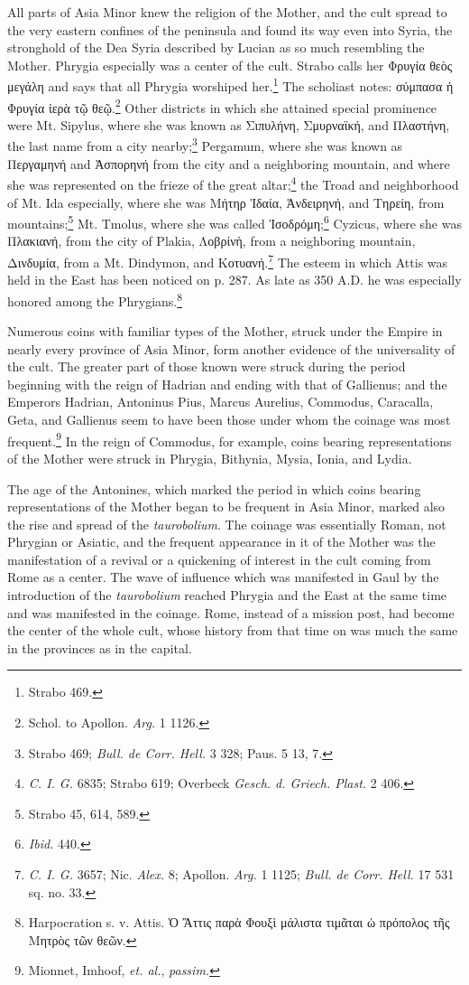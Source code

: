 \documentclass[a4paper, 11pt, oneside, polutonikogreek, english]{article}
\begin{document}
All parts of Asia Minor knew the religion of the Mother, and the cult spread to the very eastern confines of the peninsula and found its way even into Syria, the stronghold of the Dea Syria described by Lucian as so much resembling the Mother. Phrygia especially was a center of the cult. Strabo calls her Φρυγία θεὸς μεγάλη and says that all Phrygia worshiped her.\footnote{Strabo 469.} The scholiast notes: σύμπασα ἡ Φρυγία ἱερὰ τῷ θεῷ.\footnote{Schol. to Apollon. \emph{Arg.} 1 1126.} Other districts in which she attained special prominence were Mt. Sipylus, where she was known as Σιπυλήνη, Σμυρναϊκή, and Πλαστήνη, the last name from a city nearby;\footnote{Strabo 469; \emph{Bull. de Corr. Hell.} 3 328; Paus. 5 13, 7.} Pergamum, where she was known as Περγαμηνή and Ἀσπορηνή from the city and a neighboring mountain, and where she was represented on the frieze of the great altar;\footnote{\emph{C. I. G.} 6835; Strabo 619; Overbeck \emph{Gesch. d. Griech. Plast.} 2 406.} the Troad and neighborhood of Mt. Ida especially, where she was Μήτηρ Ἰδαία, Ἀνδειρηνή, and Τηρείη, from mountains;\footnote{Strabo 45, 614, 589.} Mt. Tmolus, where she was called Ἰσοδρόμη;\footnote{\emph{Ibid.} 440.} Cyzicus, where she was Πλακιανή, from the city of Plakia, Λοβρίνὴ, from a neighboring mountain, Δινδυμία, from a Mt. Dindymon, and Κοτυανή.\footnote{\emph{C. I. G.} 3657; Nic. \emph{Alex.} 8; Apollon. \emph{Arg.} 1 1125; \emph{Bull. de Corr. Hell.} 17 531 sq. no. 33.} The esteem in which Attis was held in the East has been noticed on p. 287. As late as 350 \textsc{A.D.} he was especially honored among the Phrygians.\footnote{Harpocration s. v. Attis. Ὁ Ἄττις παρὰ Φουξὶ μάλιστα τιμᾶται ὡ πρόπολος τῆς Μητρὸς τῶν θεῶν.}

Numerous coins with familiar types of the Mother, struck under the Empire in nearly every province of Asia Minor, form another evidence of the universality of the cult. The greater part of those known were struck during the period beginning with the reign of Hadrian and ending with that of Gallienus; and the Emperors Hadrian, Antoninus Pius, Marcus Aurelius, Commodus, Caracalla, Geta, and Gallienus seem to have been those under whom the coinage was most frequent.\footnote{Mionnet, Imhoof, \emph{et. al.}, \emph{passim.}} In the reign of Commodus, for example, coins bearing representations of the Mother were struck in Phrygia, Bithynia, Mysia, Ionia, and Lydia.

The age of the Antonines, which marked the period in which coins bearing representations of the Mother began to be frequent in Asia Minor, marked also the rise and spread of the \emph{taurobolium}. The coinage was essentially Roman, not Phrygian or Asiatic, and the frequent appearance in it of the Mother was the manifestation of a revival or a quickening of interest in the cult coming from Rome as a center. The wave of influence which was manifested in Gaul by the introduction of the \emph{taurobolium} reached Phrygia and the East at the same time and was manifested in the coinage. Rome, instead of a mission post, had become the center of the whole cult, whose history from that time on was much the same in the provinces as in the capital.
\end{document}
